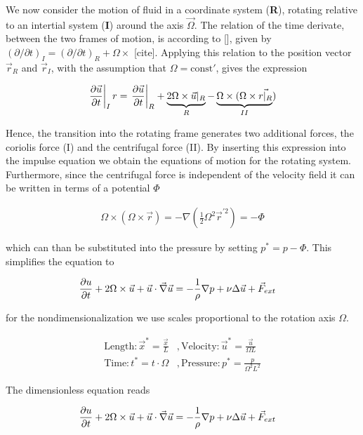 We now consider the motion of fluid in a coordinate system (\textbf{R}), rotating relative to an intertial system (\textbf{I}) around the axis $\vec{\Omega}$.
The relation of the time derivate, between the two frames of motion, is according to [], given by $(\partial/\partial t)_I = (\partial/\partial t)_R + \Omega \times $ [cite].
Applying this relation to the position vector $\vec{r}_R$ and  $\vec{r}_I$, with the assumption that $\Omega=\mathrm{const'}$, gives the expression

\begin{align}
    \left.\pdn[\vec{u}]{t}\right|_I r= \left.\pdn[\vec{u}]{t}\right|_R   + \underbrace{2\Omega \times \vec{u}|_R}_{R} - \underbrace{\Omega \times (\Omega \times \vec{r|_R}}_{II})
\end{align}

Hence, the transition into the rotating frame generates two additional forces, the coriolis force (I)  and the centrifugal force (II).
By inserting this expression into the impulse equation we obtain the equations of motion for the rotating system.
Furthermore, since the centrifugal force is independent of the velocity field it can be written in terms of a potential $\Phi$

\begin{align}
    \Omega \times (\Omega \times \vec{r}) = - \nabla(\frac{1}{2}\Omega^2\vec{r}^{'2}) = -\Phi
\end{align}

which  can than be substituted into the pressure by setting $p^* = p - \Phi$.
This simplifies the equation to

\begin{align}
    \pdn[u]{t} + 2\Omega \times \vec{u} +  \vec{u} \cdot \vec{\nabla} \vec{u} &= - \frac{1}{\rho} \nabla p + \nu \Delta \vec{u} + \vec{F}_{ext}
\end{align}

for the nondimensionalization we use scales proportional to the rotation axis $\Omega$.

\begin{align}
    \mathrm{Length}  : \vec{x}^* = \frac{\vec{x}}{L}  &, \mathrm{Velocity}: \vec{u}^* = \frac{\vec{u}}{\Omega L}\\
    \mathrm{Time}    : t^* = t \cdot \Omega      &, \mathrm{Pressure}: p^* = \frac{p}{\Omega^2 L^2}
\end{align}

The dimensionless equation reads

\begin{align}
    \pdn[u]{t} + 2\Omega \times \vec{u} +  \vec{u} \cdot \vec{\nabla} \vec{u} &= - \frac{1}{\rho} \nabla p + \nu \Delta \vec{u} + \vec{F}_{ext}
\end{align}

